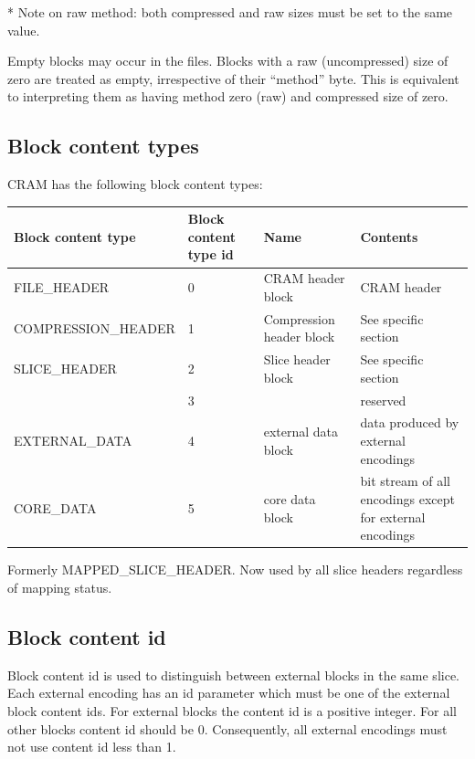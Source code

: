 \documentclass[a4paper]{article}
\begin{document}
* Note on raw method: both compressed and raw sizes must be set to the same value.

Empty blocks may occur in the files.
Blocks with a raw (uncompressed) size of zero are treated as empty,
irrespective of their ``method'' byte.  This is equivalent to
interpreting them as having method zero (raw) and compressed size of
zero.

\subsection{\textbf{Block content types}}

CRAM has the following block content types:

\begin{threeparttable}[t]
\begin{tabular}{|>{\raggedright}p{143pt}|>{\raggedright}p{45pt}|>{\raggedright}p{116pt}|>{\raggedright}p{114pt}|}
\hline
\textbf{Block content type} & \textbf{Block content type id} & \textbf{Name} & \textbf{Contents}\tabularnewline
\hline
FILE\_HEADER & 0 & CRAM header block & CRAM header\tabularnewline
\hline
COMPRESSION\_HEADER & 1 & Compression header block & See specific section\tabularnewline
\hline
SLICE\_HEADER\tnote{a} & 2 & Slice header block & See specific section\tabularnewline
\hline
 & 3 &  & reserved\tabularnewline
\hline
EXTERNAL\_DATA & 4 & external data block & data produced by external encodings\tabularnewline
\hline
CORE\_DATA & 5 & core data block & bit stream of all encodings except for external encodings\tabularnewline
\hline
\end{tabular}
\begin{tablenotes}
\item[a] Formerly MAPPED\_SLICE\_HEADER.  Now used by all slice headers regardless of mapping status.
\end{tablenotes}
\end{threeparttable}

\subsection{\textbf{Block content id}}

Block content id is used to distinguish between external blocks in the same slice. 
Each external encoding has an id parameter which must be one of the external block 
content ids. For external blocks the content id is a positive integer. For all 
other blocks content id should be 0. Consequently, all external encodings must 
not use content id less than 1. 
\end{document}
